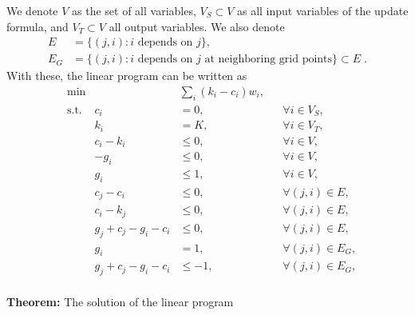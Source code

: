 \documentclass[12pt]{article}
\begin{document}
We denote $V$ as the set of all variables, $V_S\subset V$ as all input variables of the update formula, and $V_T\subset V$ all output variables.
We also denote
\[\begin{split}
E &= \{(j,i) : i \textrm{ depends on }j\},\\
E_G &= \{(j,i) : i \textrm{ depends on } j \textrm{ at neighboring grid points}\} \subset E \;.
\end{split}\]
With these, the linear program can be written as
\begin{equation}
\begin{aligned}
& \min && \sum_i (k_i - c_i) w_i,               && \\
& \textrm{s.t.} & c_i &= 0,                     && \forall i\in V_S, \\
&               & k_i &= K,                     && \forall i\in V_T, \\
&               & c_i - k_i &\le 0,             && \forall i\in V, \\
&               &-g_i &\le 0,                   && \forall i\in V, \\
&               & g_i &\le 1,                   && \forall i\in V, \\
&               & c_j - c_i &\le 0,             && \forall (j,i) \in E, \\
&               & c_i - k_j &\le 0,             && \forall (j,i) \in E, \\
&               & g_j + c_j - g_i - c_i &\le 0, && \forall (j,i) \in E, \\
&               & g_i &= 1,                     && \forall (j,i) \in E_G,\\
&               & g_j + c_j - g_i - c_i &\le-1, && \forall (j,i) \in E_G,\\
\end{aligned}
\end{equation}

{\bf Theorem:} The solution of the linear program
\end{document}
